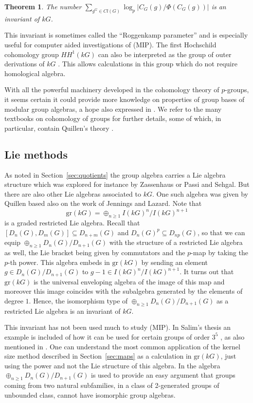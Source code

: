 \documentclass[11pt, a4paper]{amsart}
\newtheorem{theorem}{Theorem}[section]
\theoremstyle{definition}
\begin{document}
\begin{theorem}
The number $\sum_{g^G \in Cl(G)} \log_p |C_G(g)/\Phi(C_G(g))|$ is an invariant of $kG$.
\end{theorem}

This invariant is sometimes called the ``Roggenkamp parameter'' and is especially useful for computer aided investigations of (MIP). The first Hochschild cohomology group $HH^1(kG)$ can also be interpreted as the group of outer derivations of $kG$ \cite[Section 1.2]{WitherspoonHochschildBook}. This allows calculations in this group which do not require homological algebra.

With all the powerful machinery developed in the cohomology theory of $p$-groups, it seems certain it could provide more knowledge on properties of group bases of modular group algebras, a hope also expressed in \cite{HertweckSoriano06}. We refer to the many textbooks on cohomology of groups for further details, some of which, in particular, contain Quillen's theory \cite{Evens91, BensonBookII}.

\subsection{Lie methods}

As noted in Section~\ref{sec:quotients} the group algebra carries a Lie algebra structure which was explored for instance by Zassenhaus or Passi and Sehgal. But there are also other Lie algebras associated to $kG$. One such algebra was given by Quillen \cite{Quillen68} based also on the work of Jennings and Lazard. Note that 
\[\text{gr}(kG) = \oplus_{n \geq 1} I(kG)^n/I(kG)^{n+1}\]
is a graded restricted Lie algebra. Recall that $[D_n(G), D_m(G)] \subseteq D_{n+m}(G)$ and $D_n(G)^p \subseteq D_{np}(G)$, so that we can equip $\oplus_{n \geq 1} D_n(G)/D_{n+1}(G)$ with the structure of a restricted Lie algebra as well, the Lie bracket being given by commutators and the $p$-map by taking the $p$-th power. This algebra embeds in $\text{gr}(kG)$ by sending an element $g \in D_n(G)/D_{n+1}(G)$ to $g-1 \in I(kG)^n/I(kG)^{n+1}$. It turns out that $\text{gr}(kG)$ is the universal enveloping algebra of the image of this map and moreover this image coincides with the subalgebra generated by the elements of degree $1$. Hence, the isomorphism type of $\oplus_{n \geq 1} D_n(G)/D_{n+1}(G)$ as a restricted Lie algebra is an invariant of $kG$. 

This invariant has not been used much to study (MIP). In Salim's thesis an example is included of how it can be used for certain groups of order $3^5$ \cite{SalimThesis}, as also mentioned in \cite{SalimSandlingp5}. One can understand the most common application of the kernel size method described in Section~\ref{sec:maps} as a calculation in $\text{gr}(kG)$, just using the power and not the Lie structure of this algebra. In \cite[Theorem 5.8]{MargolisStanojkovski21} the algebra $\oplus_{n \geq 1} D_n(G)/D_{n+1}(G)$ is used to provide an easy argument that groups coming from two natural subfamilies, in a class of 2-generated groups of unbounded class, cannot have isomorphic group algebras.
\end{document}
